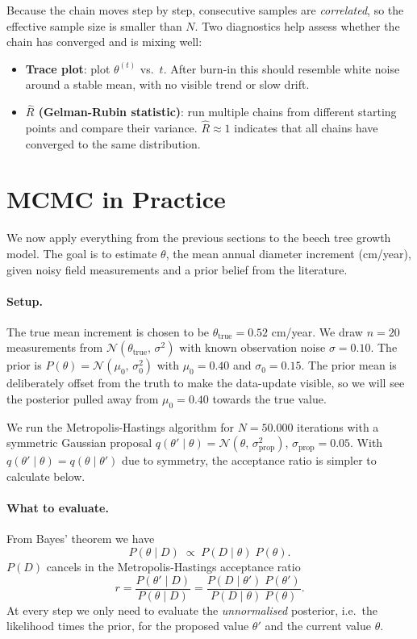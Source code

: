 \documentclass[12pt, a4paper]{article}
\begin{document}
Because the chain moves step by step, consecutive samples are
\textit{correlated}, so the effective sample size is smaller than
$N$. Two diagnostics help assess whether the chain has
converged and is mixing well:

\begin{itemize}
    \item \textbf{Trace plot}: plot $\theta^{(t)}$ vs.\ $t$. After
          burn-in this should resemble white noise around a stable
          mean, with no visible trend or slow drift.

    \item \textbf{$\hat{R}$ (Gelman-Rubin statistic)}: run multiple
          chains from different starting points and compare their
          variance. $\hat{R} \approx 1$ indicates that all chains have
          converged to the same distribution.
\end{itemize}

\section{MCMC in Practice}

We now apply everything from the previous sections to the beech tree
growth model. The goal is to estimate $\theta$, the mean annual
diameter increment (cm/year), given noisy field measurements and a
prior belief from the literature.

\paragraph{Setup.}
The true mean increment is chosen to be $\theta_\text{true} = 0.52$ cm/year.
We draw $n = 20$ measurements from
$\mathcal{N}(\theta_\text{true},\, \sigma^2)$ with known observation
noise $\sigma = 0.10$. The prior is
$P(\theta) = \mathcal{N}(\mu_0,\, \sigma_0^2)$
with $\mu_0 = 0.40$ and $\sigma_0 = 0.15$.
The prior mean is deliberately offset from the truth to make the
data-update visible, so we will see the posterior pulled away from
$\mu_0 = 0.40$ towards the true value.

We run the Metropolis-Hastings algorithm for $N = 50.000$ iterations
with a symmetric Gaussian proposal
$q(\theta' \mid \theta) = \mathcal{N}(\theta,\, \sigma_\text{prop}^2)$,
$\sigma_\text{prop} = 0.05$. With
$q(\theta' \mid \theta) = q(\theta \mid \theta')$ due to symmetry,
the acceptance ratio is simpler to calculate below.

\paragraph{What to evaluate.}
From Bayes' theorem we have
\[
    P(\theta \mid D) \;\propto\; P(D \mid \theta)\; P(\theta).
\]
 $P(D)$ cancels in the Metropolis-Hastings
acceptance ratio
\[
    r = \frac{P(\theta' \mid D)}{P(\theta \mid D)}
      = \frac{P(D \mid \theta')\; P(\theta')}{P(D \mid \theta)\; P(\theta)}.
\]
At every step we only need to evaluate the \emph{unnormalised}
posterior, i.e.\ the likelihood times the prior, for the proposed
value $\theta'$ and the current value $\theta$.
\end{document}
